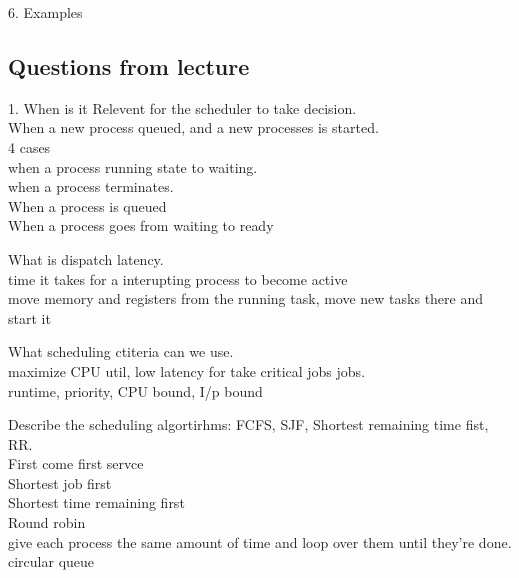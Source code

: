 \documentclass[a4paper,10pt,titlepage]{report}
\begin{document}
6. Examples\\
\newpage
\subsection{Questions from lecture}
1. When is it Relevent for the scheduler to take  decision.\\
\hspace{10mm}When a new process queued, and a new processes is started.\\
\hspace{10mm}4 cases\\
\hspace{20mm}when a process running state to waiting.\\
\hspace{20mm}when a process terminates.\\
\hspace{20mm}When a process is queued\\
\hspace{20mm}When a process goes from waiting to ready\\

\vspace{5mm}

What is dispatch latency.\\
\hspace{10mm} time it takes for a interupting process to become active \\
\hspace{10mm} move memory and registers from the running task, move new tasks there and start it \\
\vspace{5mm}

What scheduling ctiteria can we use.\\
\hspace{10mm} maximize CPU util, low latency for take critical jobs jobs.\\
\hspace{10mm} runtime, priority, CPU bound, I/p bound \\
\vspace{5mm}

Describe the scheduling algortirhms: FCFS, SJF, Shortest remaining time fist, RR.\\
\hspace{10mm} First come first servce\\
\hspace{10mm} Shortest job first \\
\hspace{10mm} Shortest time remaining first \\
\hspace{10mm} Round robin\\
\hspace{10mm}give each process the same amount of time and loop over them until they're done. circular queue\\
\vspace{5mm}
\end{document}
